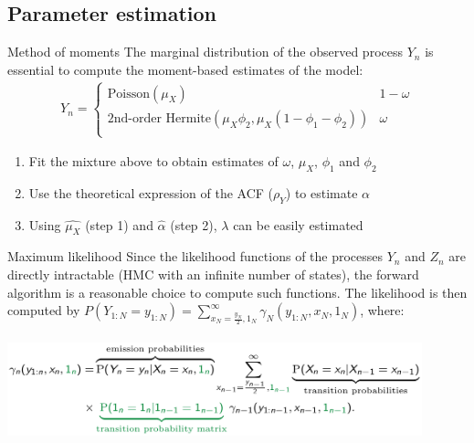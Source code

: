 \documentclass[aspectratio=169,usepdftitle=true]{beamer}
\begin{document}
\subsection{Parameter estimation}
\begin{frame}{Method of moments}
The marginal distribution of the observed process $Y_n$ is
essential to compute the moment-based estimates of the model:
\begin{align}\label{model}
Y_n=\begin{cases} 
\textrm{Poisson}(\mu_X) &  1- \omega \\
\textrm{2nd-order Hermite}(\mu_X \phi_2, \mu_X (1-\phi_1-\phi_2)) & \omega \\
\end{cases}
\end{align}
\begin{enumerate}
 \item Fit the mixture above to obtain estimates of $\omega$, $\mu_X$, $\phi_1$ and $\phi_2$
 \item Use the theoretical expression of the ACF ($\rho_Y$) to estimate $\alpha$
 \item Using $\hat{\mu_X}$ (step 1) and $\hat{\alpha}$ (step 2), $\lambda$ can be easily estimated
\end{enumerate}
\end{frame}

\begin{frame}{Maximum likelihood}
Since the likelihood functions of the processes $Y_n$ and $Z_n$ are directly
intractable (HMC with an infinite number of states), the forward
algorithm is a reasonable choice to compute such functions.
The likelihood is then computed by $P(Y_{1:N}=y_{1:N})=\sum_{x_N=\frac{y_N}{2}, 1_N}^{\infty} \gamma_N (y_{1:N}, x_N, 1_N)$,
where:
\begin{center}
\includegraphics[height=3cm,width=12cm]{gamma_n.png}
\end{center}
\end{frame}
\end{document}
